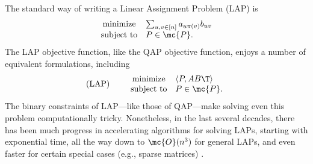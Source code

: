 The standard way of writing a Linear Assignment Problem (LAP) is
\begin{equation*}
\begin{array}{cl}
			\text{minimize}   & \sum_{u,v \in [n]} a_{u \pi(v)} b_{uv} \\
			\text{subject to}  &P \in \mc{P}.   
\end{array} %
\end{equation*}
The LAP objective function, like the QAP objective function, enjoys a number of equivalent formulations, including
% 
% 
\begin{equation}
\text{(LAP)} \qquad  
\begin{array}{cl}
			\text{minimize}   & \langle P, AB\T \rangle \\
			\text{subject to}  &P \in \mc{P}.   
\end{array}\label{eq:LAP}
\end{equation}
% 
The binary constraints of LAP---like those of QAP---make solving even this problem computationally tricky.  Nonetheless, in the last several decades, there has been much progress in accelerating algorithms for solving LAPs, starting with exponential time, all the way down to $\mc{O}(n^3)$ for general LAPs, and even faster for certain special cases (e.g., sparse matrices) \cite{Jonker1987, Burkard2009}.

